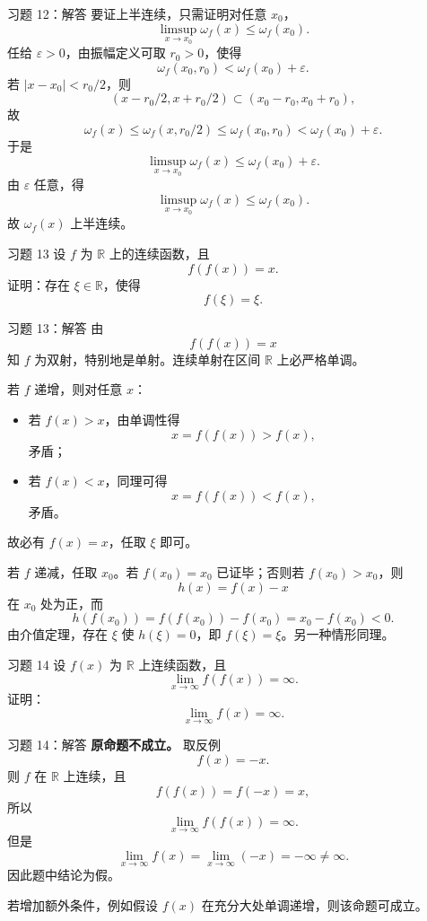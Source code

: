 ﻿\documentclass[aspectratio=169,11pt]{ctexbeamer}
\newcommand{\R}{\mathbb{R}}
\newcommand{\osc}{\omega}
\begin{document}
\begin{frame}[allowframebreaks]{习题 12：解答}
要证上半连续，只需证明对任意 $x_0$，
\[
  \limsup_{x\to x_0}\osc_f(x)\le \osc_f(x_0).
\]
任给 $\varepsilon>0$，由振幅定义可取 $r_0>0$，使得
\[
  \osc_f(x_0,r_0)<\osc_f(x_0)+\varepsilon.
\]
若 $|x-x_0|<r_0/2$，则
\[
  (x-r_0/2,x+r_0/2)\subset (x_0-r_0,x_0+r_0),
\]
故
\[
  \osc_f(x)\le \osc_f(x,r_0/2)\le \osc_f(x_0,r_0)<\osc_f(x_0)+\varepsilon.
\]
于是
\[
  \limsup_{x\to x_0}\osc_f(x)\le \osc_f(x_0)+\varepsilon.
\]
由 $\varepsilon$ 任意，得
\[
  \limsup_{x\to x_0}\osc_f(x)\le \osc_f(x_0).
\]
故 $\osc_f(x)$ 上半连续。
\end{frame}

\begin{frame}{习题 13}
设 $f$ 为 $\R$ 上的连续函数，且
\[
  f(f(x))=x.
\]
证明：存在 $\xi\in\R$，使得
\[
  f(\xi)=\xi.
\]
\end{frame}

\begin{frame}[allowframebreaks]{习题 13：解答}
由
\[
  f(f(x))=x
\]
知 $f$ 为双射，特别地是单射。连续单射在区间 $\R$ 上必严格单调。
\vspace{0.5em}

若 $f$ 递增，则对任意 $x$：
\begin{itemize}
  \item 若 $f(x)>x$，由单调性得
  \[
    x=f(f(x))>f(x),
  \]
  矛盾；
  \item 若 $f(x)<x$，同理可得
  \[
    x=f(f(x))<f(x),
  \]
  矛盾。
\end{itemize}
故必有 $f(x)=x$，任取 $\xi$ 即可。
\vspace{0.5em}

若 $f$ 递减，任取 $x_0$。若 $f(x_0)=x_0$ 已证毕；否则若 $f(x_0)>x_0$，则
\[
  h(x)=f(x)-x
\]
在 $x_0$ 处为正，而
\[
  h(f(x_0))=f(f(x_0))-f(x_0)=x_0-f(x_0)<0.
\]
由介值定理，存在 $\xi$ 使 $h(\xi)=0$，即 $f(\xi)=\xi$。另一种情形同理。
\end{frame}

\begin{frame}{习题 14}
设 $f(x)$ 为 $\R$ 上连续函数，且
\[
  \lim_{x\to\infty}f(f(x))=\infty.
\]
证明：
\[
  \lim_{x\to\infty}f(x)=\infty.
\]
\end{frame}

\begin{frame}{习题 14：解答}
\textbf{原命题不成立。}  
取反例
\[
  f(x)=-x.
\]
则 $f$ 在 $\R$ 上连续，且
\[
  f(f(x))=f(-x)=x,
\]
所以
\[
  \lim_{x\to\infty}f(f(x))=\infty.
\]
但是
\[
  \lim_{x\to\infty}f(x)=\lim_{x\to\infty}(-x)=-\infty\neq\infty.
\]
因此题中结论为假。
\vspace{0.5em}

若增加额外条件，例如假设 $f(x)$ 在充分大处单调递增，则该命题可成立。
\end{frame}
\end{document}
